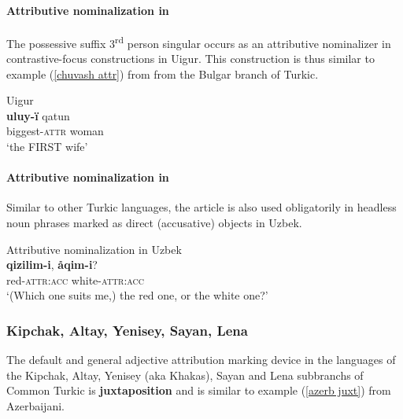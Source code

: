 \paragraph{Attributive nominalization in } 
The possessive suffix 3\textsuperscript{rd} person singular occurs as an attributive nominalizer in contrastive-focus constructions in Uigur. This construction is thus similar to example (\ref{chuvash attr}) from  from the Bulgar branch of Turkic.
\begin{exe}
\ex 
\rm{Uigur \citep[17–18, Footnote 58]{benzing1993b}}\\
\gll	\textbf{uluy-ï} qatun\\
	biggest-\textsc{attr} woman\\
\glt	‘the FIRST wife’
\end{exe}

\paragraph{Attributive nominalization in }
Similar to other Turkic languages, the article is also used obligatorily in headless noun phrases marked as direct (accusative) objects in Uzbek. 
\begin{exe}
\ex 
\label{uzbek headless acc}	
\rm{Attributive nominalization in Uzbek \citep[371]{boeschoten1998}}\\
 \textbf{qizilim-i}, \textbf{åqim-i}?\\
 	{ } red-\textsc{attr:acc} white-\textsc{attr:acc}\\
\glt 	‘(Which one suits me,) the red one, or the white one?’
\end{exe}

\subsubsection{Kipchak, Altay, Yenisey, Sayan, Lena}
The default and general adjective attribution marking device in the languages of the Kipchak, Altay, Yenisey (aka Khakas), Sayan and Lena subbranchs of Common Turkic is \textbf{juxtaposition} and is similar to example (\ref{azerb juxt}) from Azerbaijani.

